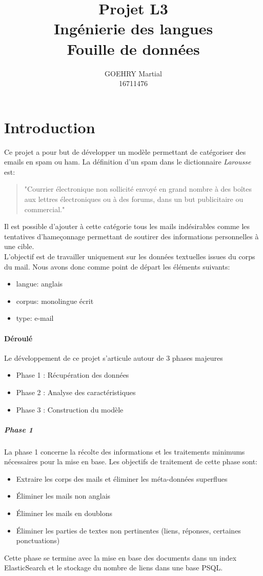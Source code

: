 \documentclass[a4paper,12pt]{article}
\title{Projet L3\\Ingénierie des langues\\Fouille de données}
\author{GOEHRY Martial\\16711476}
\begin{document}
	\maketitle
	\tableofcontents
	\newpage
	
\section*{Introduction}
	Ce projet a pour but de développer un modèle permettant de catégoriser des emails en spam ou ham.
	La définition d'un spam dans le dictionnaire \emph{Larousse} est:
	
	\begin{quote}
	"Courrier électronique non sollicité envoyé en grand nombre à des boîtes aux lettres électroniques ou à des forums, dans un but publicitaire ou commercial."
	\end{quote}
	
	Il est possible d'ajouter à cette catégorie tous les mails indésirables comme les tentatives d'hameçonnage permettant de soutirer des informations personnelles à une cible.\\ 
	
	L'objectif est de travailler uniquement sur les données textuelles issues du corps du mail.
	Nous avons donc comme point de départ les éléments suivants:
	\begin{itemize}
		\item langue: anglais
		\item corpus: monolingue écrit
		\item type: e-mail
	\end{itemize}
	
	\paragraph{Déroulé} Le développement de ce projet s'articule autour de 3 phases majeures
		\begin{itemize}
			\item Phase 1 : Récupération des données
			\item Phase 2 : Analyse des caractéristiques
			\item Phase 3 : Construction du modèle
		\end{itemize}
		
	
	\subparagraph{Phase 1} La phase 1 concerne la récolte des informations et les traitements minimums nécessaires pour la mise en base. Les objectifs de traitement de cette phase sont:
	\begin{itemize}
		\item Extraire les corps des mails et éliminer les méta-données superflues
		\item Éliminer les mails non anglais
		\item Éliminer les mails en doublons
		\item Éliminer les parties de textes non pertinentes (liens, réponses, certaines ponctuations)
	\end{itemize}
	Cette phase se termine avec la mise en base des documents dans un index ElasticSearch et le stockage du nombre de liens dans une base PSQL.
	
\end{document}

